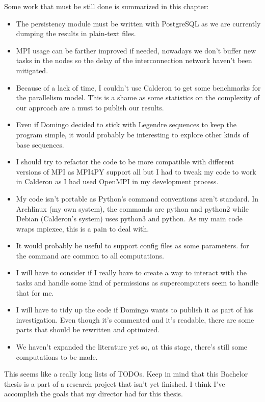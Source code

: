 \documentclass{tfg_domingo}
\begin{document}
  Some work that must be still done is summarized in this chapter:
  \begin{itemize}
    \item The persistency module must be written with PostgreSQL as we are
    currently dumping the results in plain-text files.
    \item MPI usage can be farther improved if needed, nowadays we don't
    buffer new tasks in the nodes so the delay of the interconnection
    network haven't been mitigated.
    \item Because of a lack of time, I couldn't use Calderon to get some
    benchmarks for the parallelism model. This is a shame as some statistics
    on the complexity of our approach are a must to publish our results.
    \item Even if Domingo decided to stick with Legendre sequences to keep the
    program simple, it would probably be interesting to explore other kinds of
    base sequences.
    \item I should try to refactor the code to be more compatible with
    different versions of MPI as MPI4PY support all but I had to tweak my code
    to work in Calderon as I had used OpenMPI in my development process.
    \item My code isn't portable as Python's command conventions aren't
    standard. In Archlinux (my own system), the commands are python and python2
    while Debian (Calderon's system) uses python3 and python. As my main
    code wraps mpiexec, this is a pain to deal with.
    \item It would probably be useful to support config files as some
    parameters.
    for the command are common to all computations.
    \item I will have to consider if I really have to create a way to interact
    with the tasks and handle some kind of permissions as supercomputers seem
    to handle that for me.
    \item I will have to tidy up the code if Domingo wants to publish it as
    part of his investigation. Even though it's commented and it's readable,
    there are some parts that should be rewritten and optimized.
    \item We haven't expanded the literature yet so, at this stage, there's
    still some computations to be made.
  \end{itemize}

  This seems like a really long lists of TODOs. Keep in mind that this
  Bachelor thesis is a part of a research project that isn't yet finished. I
  think I've accomplish the goals that my director had for this thesis.
\end{document}

